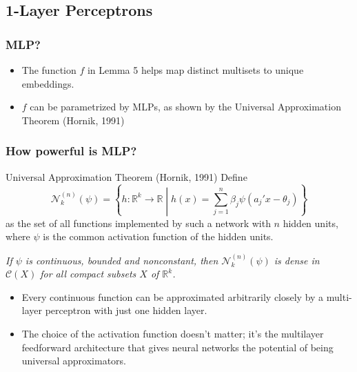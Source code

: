 \documentclass{beamer}
\begin{document}

\subsection{1-Layer Perceptrons}

\begin{frame}
\frametitle{MLP?}

\begin{itemize}
	\item The function $f$ in Lemma 5 helps map distinct multisets to unique embeddings. \pause
	
	\item $f$ can be parametrized by MLPs, as shown by the Universal Approximation Theorem (Hornik, 1991) \pause
	

\end{itemize}

\end{frame}

\begin{frame}
\frametitle{How powerful is MLP?}

\begin{block}{Universal Approximation Theorem (Hornik, 1991)}
Define
$$\mathscr{N}_k^{(n)} (\psi) = \left\{ h : \mathbb{R}^k \rightarrow \mathbb{R} \middle| h(x) = \sum_{j = 1}^n \beta_j \psi(a_j' x - \theta_j) \right\}$$
as the set of all functions implemented by such a network with $n$ hidden units, where $\psi$ is the common activation function of the hidden units.

{\it If $\psi$ is continuous, bounded and nonconstant, then $\mathscr{N}_k^{(n)} (\psi)$ is dense in $\mathscr{C}(X)$ for all compact subsets $X$ of $\mathbb{R}^k$.}
\end{block} \pause

\begin{itemize}
	\item Every continuous function can be approximated arbitrarily closely by a multi-layer perceptron with just one hidden layer. \pause
	
	\item The choice of the activation function doesn't matter; it's the multilayer feedforward architecture that gives neural networks the potential of being universal approximators.
\end{itemize}

\end{frame}
\end{document}

